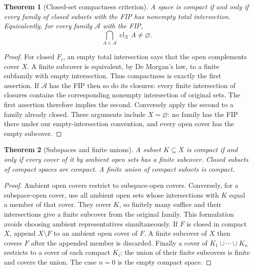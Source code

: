 \documentclass[11pt,oneside,openany]{book}
\newtheorem{theorem}{Theorem}[chapter]
\theoremstyle{definition}
\theoremstyle{remark}
\DeclareMathOperator{\cl}{cl}
\begin{document}
\begin{theorem}[Closed-set compactness criterion]\label{d10:05:fip}
A space is compact if and only if every family of closed subsets with the FIP has nonempty total intersection. Equivalently, for every family $\mathcal A$ with the FIP,
\[
 \bigcap_{A\in\mathcal A}\cl_X A\ne\varnothing.
\]
\end{theorem}
\begin{proof}
For closed $F_i$, an empty total intersection says that the open complements cover $X$. A finite subcover is equivalent, by De Morgan's law, to a finite subfamily with empty intersection. Thus compactness is exactly the first assertion. If $\mathcal A$ has the FIP then so do its closures: every finite intersection of closures contains the corresponding nonempty intersection of original sets. The first assertion therefore implies the second. Conversely apply the second to a family already closed. These arguments include $X=\varnothing$: no family has the FIP there under our empty-intersection convention, and every open cover has the empty subcover.
\end{proof}

\begin{theorem}[Subspaces and finite unions]\label{d10:05:compact-heredity}
A subset $K\subseteq X$ is compact if and only if every cover of it by ambient open sets has a finite subcover. Closed subsets of compact spaces are compact. A finite union of compact subsets is compact.
\end{theorem}
\begin{proof}
Ambient open covers restrict to subspace-open covers. Conversely, for a subspace-open cover, use all ambient open sets whose intersections with $K$ equal a member of that cover. They cover $K$, so finitely many suffice and their intersections give a finite subcover from the original family. This formulation avoids choosing ambient representatives simultaneously. If $F$ is closed in compact $X$, append $X\setminus F$ to an ambient open cover of $F$. A finite subcover of $X$ then covers $F$ after the appended member is discarded. Finally a cover of $K_1\cup\cdots\cup K_n$ restricts to a cover of each compact $K_i$; the union of their finite subcovers is finite and covers the union. The case $n=0$ is the empty compact space.
\end{proof}
\end{document}
